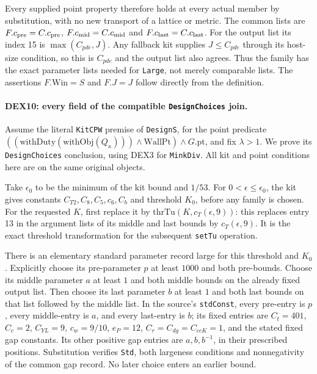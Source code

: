 \documentclass[11pt,a4paper]{article}
\numberwithin{equation}{section}
\theoremstyle{remark}\newtheorem{remark}[theorem]{Remark}
\begin{document}
Every supplied point property therefore holds at every actual member
by substitution, with no new transport of a lattice or metric.
The common lists are $F.c_{\rm pre}=C.c_{\rm pre}$,
$F.c_{\rm mid}=C.c_{\rm mid}$ and $F.c_{\rm last}=C.c_{\rm last}$.
For the output list its index 15 is $\max(C_{pde},J)$.
Any fallback kit supplies $J\le C_{pde}$ through its host-size
condition, so this is $C_{pde}$ and the output list also agrees.
Thus the family has the exact parameter lists needed for
\texttt{Large}, not merely comparable lists. The assertions
$F.\mathrm{Win}=S$ and $F.J=J$ follow directly from the definition.

\paragraph{DEX10: every field of the compatible \texttt{DesignChoices} join.}
\label{claim:DEX10}
Assume the literal \texttt{KitCPW} premise of \texttt{DesignS}, for
the point predicate
$((\mathrm{withDuty}(\mathrm{withObj}(Q_\kappa)))\wedge
\mathrm{WallPt})\wedge G.\mathrm{pt}$, and fix $\lambda>1$.
We prove its \texttt{DesignChoices} conclusion, using DEX3 for
\texttt{MinkDiv}. All kit and point conditions here are on the
same original objects.

Take $\epsilon_0$ to be the minimum of the kit bound and $1/53$.
For $0<\epsilon\le\epsilon_0$, the kit gives constants
$C_{T2},C_8,C_5,c_6,C_b$ and threshold $K_0$, before any family
is chosen. For the requested $K$, first replace it by
$\mathrm{thrTu}(K,c_T(\epsilon,9))$: this replaces entry 13 in the
argument lists of its middle and last bounds by $c_T(\epsilon,9)$.
It is the exact threshold transformation for the subsequent
\texttt{setTu} operation.

There is an elementary standard parameter record large for this
threshold and $K_0$. Explicitly choose its pre-parameter $p$ at least
$1000$ and both pre-bounds. Choose its middle parameter $a$ at least
$1$ and both middle bounds on the already fixed output list. Then
choose its last parameter $b$ at least $1$ and both last bounds on
that list followed by the middle list. In the source's
\texttt{stdConst}, every pre-entry is $p$, every middle-entry is $a$,
and every last-entry is $b$; its fixed entries are
$C_t=401$, $C_c=2$, $C_{YL}=9$, $c_w=9/10$, $e_P=12$,
$C_r=C_{dg}=C_{ccK}=1$, and the stated fixed gap constants.
Its other positive gap entries are $a,b,b^{-1}$, in their prescribed
positions. Substitution verifies \texttt{Std}, both largeness
conditions and nonnegativity of the common gap record. No later
choice enters an earlier bound.
\end{document}
